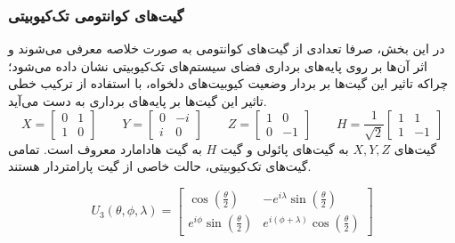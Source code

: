 \subsubsection{
    گیت‌های کوانتومی تک‌کیوبیتی
}
در این بخش، صرفا تعدادی از گیت‌های کوانتومی به صورت خلاصه معرفی می‌شوند و اثر آن‌ها بر روی پایه‌های برداری فضای سیستم‌های تک‌کیوبیتی نشان داده می‌شود؛ چراکه تاثیر این گیت‌ها بر بردار وضعیت کیوبیت‌های دلخواه، با استفاده از ترکیب خطی تاثیر این گیت‌ها بر پایه‌های برداری به دست می‌آید.
\begin{equation}
X = \begin{bmatrix} 0 & 1 \\ 1 & 0 \end{bmatrix} \qquad
Y = \begin{bmatrix} 0 & -i \\ i & 0 \end{bmatrix} \qquad
Z = \begin{bmatrix} 1 & 0 \\ 0 & -1 \end{bmatrix} \qquad
H = \frac{1}{\sqrt{2}} \begin{bmatrix} 1 & 1 \\ 1 & -1 \end{bmatrix}
\end{equation}
گیت‌های 
$X, Y, Z$
به گیت‌های پائولی و گیت
$H$
به گیت هادامارد معروف است.
تمامی گیت‌های تک‌کیوبیتی، حالت خاصی از گیت پارامتردار 
هستند.

\begin{equation}
U_3(\theta, \phi, \lambda) = \begin{bmatrix} \cos(\frac{\theta}{2}) & -e^{i\lambda}\sin(\frac{\theta}{2}) \\[6pt]
            e^{i\phi}\sin(\frac{\theta}{2}) & e^{i(\phi+\lambda)}\cos(\frac{\theta}{2})
     \end{bmatrix}
\end{equation}

